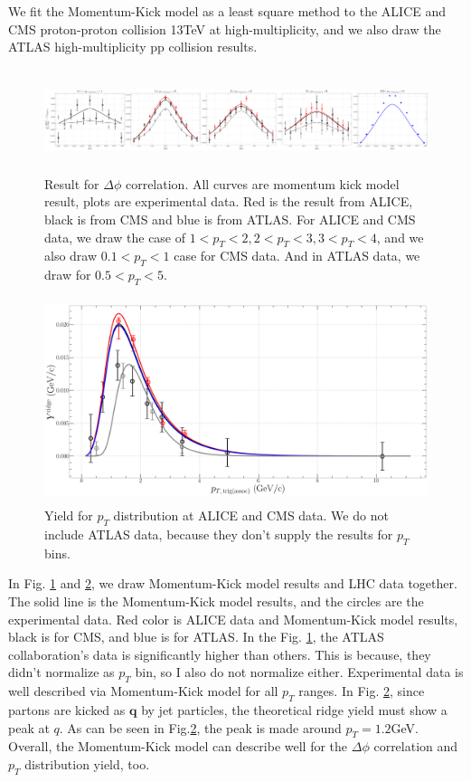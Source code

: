 \documentclass[jkps,fleqn,showpacs,showkeys]{revtex4}
\begin{document}
We fit the Momentum-Kick model as a least square method to the ALICE and CMS proton-proton collision 13TeV at high-multiplicity\cite{alice, cms}, and we also draw the ATLAS high-multiplicity pp collision results\cite{atlas}.

\begin{figure}[ht]
\centering
\includegraphics[width=18cm, height=3cm]{./Figures/Paper_phiCorr}
\caption{Result for $\Delta \phi$ correlation. All curves are momentum kick model result, plots are experimental data.
Red is the result from ALICE, black is from CMS and blue is from ATLAS.
For ALICE and CMS data, we draw the case of $1<p_T<2, 2<p_T<3, 3<p_T<4$, and we also draw $0.1<p_T<1$ case for CMS data. And in ATLAS data, we draw for $0.5<p_T<5$.}
\label{figure:phicorr}
\end{figure}

\begin{figure}[ht]
\centering
\includegraphics[width=12cm, height=6cm]{./Figures/Paper_pTdis}
\caption{Yield for $p_T$ distribution at ALICE and CMS data. We do not include ATLAS data, because they don't supply the results for $p_T$ bins.}
\label{figure:pTdis}
\end{figure}

In Fig. \ref{figure:phicorr} and \ref{figure:pTdis}, we draw Momentum-Kick model results and LHC data together.
The solid line is the Momentum-Kick model results, and the circles are the experimental data.
Red color is ALICE data and Momentum-Kick model results, black is for CMS, and blue is for ATLAS.
In the Fig. \ref{figure:phicorr}, the ATLAS collaboration's data is significantly higher than others.
This is because, they didn't normalize as $p_T$ bin, so I also do not normalize either.
Experimental data is well described via Momentum-Kick model for all $p_T$ ranges.
In Fig. \ref{figure:pTdis}, since partons are kicked as $\textbf{q}$ by jet particles, the theoretical ridge yield must show a peak at $q$.
As can be seen in Fig.\ref{figure:pTdis}, the peak is made around $p_T=1.2$GeV.
Overall, the Momentum-Kick model can describe well for the $\Delta\phi$ correlation and $p_T$ distribution yield, too.
\end{document}
